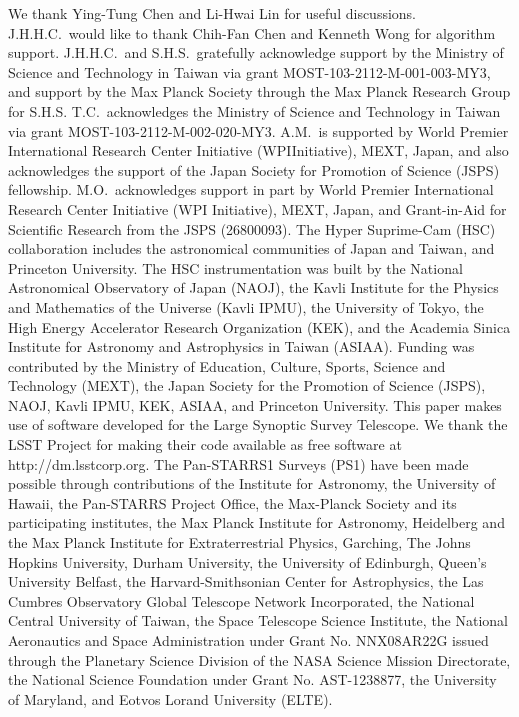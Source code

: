 \documentclass[apj]{emulateapj}
\begin{document}
We thank Ying-Tung Chen and Li-Hwai Lin for useful discussions.
J.H.H.C.~would like to thank Chih-Fan Chen and Kenneth Wong for algorithm support.
J.H.H.C.~and S.H.S.~gratefully acknowledge support by the Ministry of Science and Technology in Taiwan via grant MOST-103-2112-M-001-003-MY3, and support by the Max Planck Society through the Max Planck Research Group for S.H.S.
T.C.~acknowledges the Ministry of Science and Technology in Taiwan via grant MOST-103-2112-M-002-020-MY3.
%  
A.M.~is supported by World Premier International Research Center Initiative (WPIInitiative), MEXT, Japan, 
and also acknowledges the support of the Japan Society for Promotion of Science (JSPS) fellowship.
%
M.O.~acknowledges support in part by World Premier International
Research Center Initiative (WPI Initiative), MEXT, Japan, and
Grant-in-Aid for Scientific Research from the JSPS (26800093).
%
The Hyper Suprime-Cam (HSC) collaboration includes the astronomical
communities of Japan and Taiwan, and Princeton University.  The HSC
instrumentation was built by the National Astronomical Observatory of
Japan (NAOJ), the Kavli Institute for the Physics and Mathematics of
the Universe (Kavli IPMU), the University of Tokyo, the High Energy
Accelerator Research Organization (KEK), and the Academia Sinica
Institute for Astronomy and Astrophysics in Taiwan (ASIAA).  Funding
was contributed by the Ministry of Education, Culture, Sports, Science
and Technology (MEXT), the Japan Society for the Promotion of Science
(JSPS), NAOJ, Kavli IPMU, KEK, ASIAA, and Princeton University.
%
This paper makes use of software developed for the Large Synoptic Survey Telescope. We thank the LSST Project for making their code available as free software at http://dm.lsstcorp.org.
The Pan-STARRS1 Surveys (PS1) have been made possible through contributions of the Institute for Astronomy, the University of Hawaii, the Pan-STARRS Project Office, the Max-Planck Society and its participating institutes, the Max Planck Institute for Astronomy, Heidelberg and the Max Planck Institute for Extraterrestrial Physics, Garching, The Johns Hopkins University, Durham University, the University of Edinburgh, Queen's University Belfast, the Harvard-Smithsonian Center for Astrophysics, the Las Cumbres Observatory Global Telescope Network Incorporated, the National Central University of Taiwan, the Space Telescope Science Institute, the National Aeronautics and Space Administration under Grant No. NNX08AR22G issued through the Planetary Science Division of the NASA Science Mission Directorate, the National Science Foundation under Grant No. AST-1238877, the University of Maryland, and Eotvos Lorand University (ELTE).
%







\label{lastpage}
\end{document}
